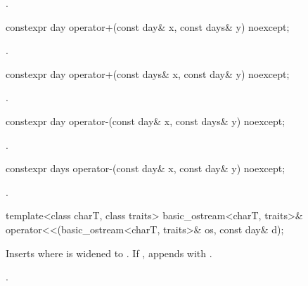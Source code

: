 \begin{itemdescr}
\pnum
\returns {}.
\end{itemdescr}

%
\begin{itemdecl}
constexpr day operator+(const day& x, const days& y) noexcept;
\end{itemdecl}

\begin{itemdescr}
\pnum
\returns {}.
\end{itemdescr}

%
\begin{itemdecl}
constexpr day operator+(const days& x, const day& y) noexcept;
\end{itemdecl}

\begin{itemdescr}
\pnum
\returns {}.
\end{itemdescr}

%
\begin{itemdecl}
constexpr day operator-(const day& x, const days& y) noexcept;
\end{itemdecl}

\begin{itemdescr}
\pnum
\returns {}.
\end{itemdescr}

%
\begin{itemdecl}
constexpr days operator-(const day& x, const day& y) noexcept;
\end{itemdecl}

\begin{itemdescr}
\pnum
\returns {}.
\end{itemdescr}

%
\begin{itemdecl}
template<class charT, class traits>
  basic_ostream<charT, traits>&
    operator<<(basic_ostream<charT, traits>& os, const day& d);
\end{itemdecl}

\begin{itemdescr}
\pnum
\effects
Inserts 
where  is  widened to .
If , appends with .

\pnum
\returns {}.
\end{itemdescr}

